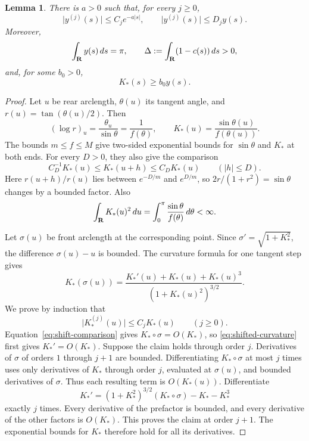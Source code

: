 \documentclass[11pt]{article}
\numberwithin{equation}{section}
\newtheorem{lemma}[theorem]{Lemma}
\newcommand{\R}{{\bf R}}
\newcommand{\abs}[1]{\lvert #1\rvert}
\begin{document}
\begin{lemma}\label{lem:pulse}
There is \(a>0\) such that, for every \(j\geq0\),
\begin{equation}\label{eq:pulse-bounds}
  \abs{y^{(j)}(s)}\leq C_j e^{-a\abs s},\qquad
  \abs{y^{(j)}(s)}\leq D_j y(s).
\end{equation}
Moreover,
\begin{equation}\label{eq:mass-defect}
  \int_\R y(s)\,ds=\pi,\qquad
  \Delta:=\int_\R(1-c(s))\,ds>0,
\end{equation}
and, for some \(b_0>0\),
\begin{equation}\label{eq:K-lower}
  K_*(s)\geq b_0y(s).
\end{equation}
\end{lemma}

\begin{proof}
Let \(u\) be rear arclength, \(\theta(u)\) its tangent angle, and
\(r(u)=\tan(\theta(u)/2)\). Then
\begin{equation}\label{eq:half-angle}
  (\log r)_u=\frac{\theta_u}{\sin\theta}=\frac1{f(\theta)},
  \qquad K_*(u)=\frac{\sin\theta(u)}{f(\theta(u))}.
\end{equation}
The bounds \(m\leq f\leq M\) give two-sided exponential bounds for
\(\sin\theta\) and \(K_*\) at both ends. For every \(D>0\), they also give
the comparison
\begin{equation}\label{eq:shift-comparison}
  C_D^{-1}K_*(u)\leq K_*(u+h)\leq C_DK_*(u)
  \qquad(\abs h\leq D).
\end{equation}
Here \(r(u+h)/r(u)\) lies between \(e^{-D/m}\) and \(e^{D/m}\), so
\(2r/(1+r^2)=\sin\theta\) changes by a bounded factor. Also
\[
  \int_\R K_*(u)^2\,du
  =\int_0^\pi\frac{\sin\theta}{f(\theta)}\,d\theta<\infty.
\]

Let \(\sigma(u)\) be front arclength at the corresponding point. Since
\(\sigma'=\sqrt{1+K_*^2}\), the difference \(\sigma(u)-u\) is bounded.
The curvature formula for one tangent step gives
\begin{equation}\label{eq:shifted-curvature}
  K_*(\sigma(u))
  =\frac{K_*'(u)+K_*(u)+K_*(u)^3}{(1+K_*(u)^2)^{3/2}}.
\end{equation}
We prove by induction that
\begin{equation}\label{eq:K-derivatives}
  \abs{K_*^{(j)}(u)}\leq C_jK_*(u)\qquad(j\geq0).
\end{equation}
Equation~\eqref{eq:shift-comparison} gives \(K_*\circ\sigma=O(K_*)\), so
\eqref{eq:shifted-curvature} first gives \(K_*'=O(K_*)\). Suppose the claim
holds through order \(j\). Derivatives of \(\sigma\) of orders \(1\) through
\(j+1\) are bounded. Differentiating \(K_*\circ\sigma\) at most \(j\) times
uses only derivatives of \(K_*\) through order \(j\), evaluated at
\(\sigma(u)\), and bounded derivatives of \(\sigma\). Thus each resulting
term is \(O(K_*(u))\). Differentiate
\[
  K_*'=(1+K_*^2)^{3/2}(K_*\circ\sigma)-K_*-K_*^3
\]
exactly \(j\) times. Every derivative of the prefactor is bounded, and every
derivative of the other factors is \(O(K_*)\). This proves the claim at
order \(j+1\). The exponential bounds for \(K_*\) therefore hold for all its
derivatives.


\end{proof}
\end{document}
